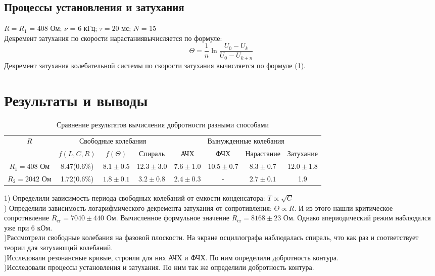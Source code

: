 \subsection*{Процессы установления и затухания}

\indent $R = R_1$ = 408 Ом; $\nu$ = 6 кГц; $\tau = 20$ мс; $N$ = 15\\ 
\indent Декремент затухания по скорости нарастаниявычисляется по формуле:
\begin{equation}
    \Theta = \frac{1}{n}\ln\frac{U_0 - U_k}{U_0 - U_{k + n}}
\end{equation}
\indent Декремент затухания колебательной системы по скорости затухания вычисляется по формуле (1).

\section*{Результаты и выводы}

\begin{table}[h!]
    \centering
    \begin{tabular}{c|c|c|c|c|c|c|c|}
        \hline
        \multirow{2}{*}{$R$} & \multicolumn{3}{|c|}{Свободные колебания} & \multicolumn{4}{|c|}{Вынужденные колебания}\\
         & $f(L, C, R)$ & $f(\Theta)$ & Спираль & АЧХ & ФЧХ & Нарастание & Затухание\\\hline
        $R_1 = 408$ Ом & 8.47($0.6\%$) & $8.1\pm 0.5$ & $12.3\pm 3.0 $ & $7.6\pm1.0$ & $10.5\pm0.7$ & $8.3\pm 0.7$ & $12.0\pm1.8$\\\hline
        $R_2 = 2042$ Ом & 1.72($0.6\%$) & $1.8\pm 0.1$ & $3.2\pm 0.8$ & $2.4\pm0.3$ & - & $2.7\pm 0.1$ & 1.9\\\hline
    \end{tabular}
    \caption{Сравнение результатов вычисления добротности разными способами}
\end{table}

1) Определили зависимость периода свободных колебаний от емкости конденсатора: $T \propto \sqrt{C}$\\
) Определили зависимость логарифмического декремента затухания от сопротивления: $\Theta \propto R$. 
И из этого нашли критическое сопротивление $R_{\text{cr}} = 7040\pm440$ Ом. Вычисленное формульное значение $R_{\text{cr}} = 8168\pm23$ Ом. Однако апериодический режим наблюдался уже при 6 кОм.\\
)Рассмотрели свободные колебания на фазовой плоскости. На экране осциллографа наблюдалась спираль, что как раз и соответствует теории для затухающий колебаний. \\
)Исследовали резонансные кривые, строили для них АЧХ и ФЧХ. По ним определили добротность контура.\\
)Исследовали процессы установления и затухания. По ним так же определили добротность контура.



